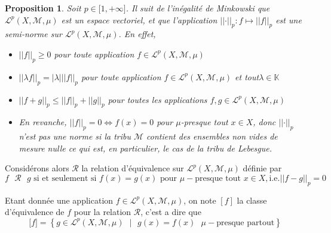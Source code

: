 \documentclass[3pt]{article}
\newtheorem{proposition}[theorem]{Proposition}
\begin{document}
\begin{proposition}
Soit $p\in \lbrack 1,+\infty ]$. Il suit de l'in\'{e}galit\'{e} de Minkowski
que $\mathcal{L}^{p}(X,\mathcal{M},\mu )$ est un espace vectoriel, et que
l'application $\left\vert \left\vert \cdot \right\vert \right\vert
_{p}:f\mapsto \left\vert \left\vert f\right\vert \right\vert _{p}$ est une
semi-norme sur $\mathcal{L}^{p}(X,\mathcal{M},\mu )$. En effet,

\begin{itemize}
\item $\left\vert \left\vert f\right\vert \right\vert _{p}\geq 0$ pour toute
application $f\in \mathcal{L}^{p}(X,\mathcal{M},\mu )$

\item $\left\vert \left\vert \lambda f\right\vert \right\vert
_{p}=\left\vert \lambda \right\vert \left\vert \left\vert f\right\vert
\right\vert _{p}$  pour toute application $f\in \mathcal{L}^{p}(X,\mathcal{M}%
,\mu )$ et tout$\lambda \in \mathbb{K}$

\item $\left\vert \left\vert f+g\right\vert \right\vert _{p}\leq \left\vert
\left\vert f\right\vert \right\vert _{p}+\left\vert \left\vert g\right\vert
\right\vert _{p}$ pour toutes les applications $f,g\in \mathcal{L}^{p}(X,%
\mathcal{M},\mu )$

\item En revanche, $\left\vert \left\vert f\right\vert \right\vert
_{p}=0\Leftrightarrow f(x)=0$ pour $\mu $-presque tout $x\in X$, donc $%
\left\vert \left\vert \cdot \right\vert \right\vert _{p}$ n'est pas une
norme si la tribu $\mathcal{M}$ contient des ensembles non vides de mesure
nulle ce qui est, en particulier, le cas de la tribu de Lebesgue.
\end{itemize}
\end{proposition}

\bigskip 

Consid\'{e}rons alors $\mathcal{R}$ la relation d'\'{e}quivalence sur $%
\mathcal{L}^{p}(X,\mathcal{M},\mu )$ d\'{e}finie par%
\begin{equation*}
f\text{ }\mathcal{R}\text{ }g\text{ si et seulement si }f(x)=g(x)\text{ pour 
}\mu -\text{presque tout }x\in X,\text{i.e}.\left\vert \left\vert
f-g\right\vert \right\vert _{p}=0
\end{equation*}

Etant donn\'{e}e une application $f\in \mathcal{L}^{p}(X,\mathcal{M},\mu )$,
on note $[f]$ la classe d'\'{e}quivalence de $f$ pour la relation $\mathcal{R%
}$, c'est a dire que 
\begin{equation*}
\lbrack f]=\left\{ g\in \mathcal{L}^{p}(X,\mathcal{M},\mu )\text{ }|\text{\ }%
g(x)=f(x)\text{\ }\mu -\text{presque partout}\right\} 
\end{equation*}
\end{document}
